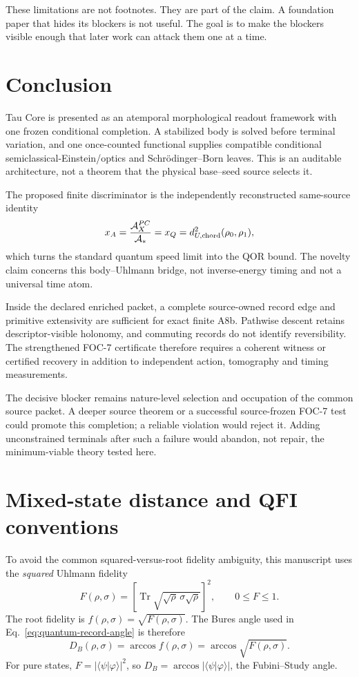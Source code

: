 \documentclass[11pt]{article}
\begin{document}
These limitations are not footnotes.  They are part of the claim.  A
foundation paper that hides its blockers is not useful.  The goal is to make
the blockers visible enough that later work can attack them one at a time.

\section{Conclusion}

Tau Core is presented as an atemporal morphological readout framework with one
frozen conditional completion.  A stabilized body is solved before terminal
variation, and one once-counted functional supplies compatible conditional
semiclassical-Einstein/optics and Schr\"odinger--Born leaves.  This is an
auditable architecture, not a theorem that the physical base--seed source
selects it.

The proposed finite discriminator is the independently reconstructed
same-source identity
\[
 x_A={\mathcal A_X^{PC}\over\mathcal A_*}
 =x_Q=d_{U,\mathrm{chord}}^2(\rho_0,\rho_1),
\]
which turns the standard quantum speed limit into the QOR bound.  The novelty
claim concerns this body--Uhlmann bridge, not inverse-energy timing and not a
universal time atom.

Inside the declared enriched packet, a complete source-owned record edge and
primitive extensivity are sufficient for exact finite A8b.  Pathwise descent
retains descriptor-visible holonomy, and commuting records do not identify
reversibility.  The strengthened FOC-7 certificate therefore requires a
coherent witness or certified recovery in addition to independent action,
tomography and timing measurements.

The decisive blocker remains nature-level selection and occupation of the
common source packet.  A deeper source theorem or a successful source-frozen
FOC-7 test could promote this completion; a reliable violation would reject
it.  Adding unconstrained terminals after such a failure would abandon, not
repair, the minimum-viable theory tested here.

\appendix
\section{Mixed-state distance and QFI conventions}
\label{app:bures-qfi}

To avoid the common squared-versus-root fidelity ambiguity, this manuscript
uses the \emph{squared} Uhlmann fidelity
\begin{equation}
  F(\rho,\sigma)
  =\left[\operatorname{Tr}
  \sqrt{\sqrt\rho\,\sigma\sqrt\rho}\right]^2,
  \qquad 0\leq F\leq1.
  \label{eq:appendix-squared-fidelity}
\end{equation}
The root fidelity is
\(f(\rho,\sigma)=\sqrt{F(\rho,\sigma)}\).  The Bures angle used in
Eq.~\eqref{eq:quantum-record-angle} is therefore
\begin{equation}
  D_B(\rho,\sigma)=\arccos f(\rho,\sigma)
  =\arccos\sqrt{F(\rho,\sigma)}.
  \label{eq:appendix-bures-angle}
\end{equation}
For pure states, \(F=|\langle\psi|\varphi\rangle|^2\), so
\(D_B=\arccos|\langle\psi|\varphi\rangle|\), the Fubini--Study angle.
\end{document}

